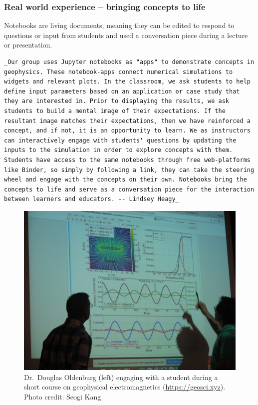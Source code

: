 \documentclass[]{book}
\begin{document}
\subsubsection{Real world experience -- bringing concepts to
life}\label{real-world-experience-bringing-concepts-to-life}

Notebooks are living documents, meaning they can be edited to respond to
questions or input from students and used a conversation piece during a
lecture or presentation.

\begin{verbatim}
_Our group uses Jupyter notebooks as "apps" to demonstrate concepts in geophysics. These notebook-apps connect numerical simulations to widgets and relevant plots. In the classroom, we ask students to help define input parameters based on an application or case study that they are interested in. Prior to displaying the results, we ask students to build a mental image of their expectations. If the resultant image matches their expectations, then we have reinforced a concept, and if not, it is an opportunity to learn. We as instructors can interactively engage with students' questions by updating the inputs to the simulation in order to explore concepts with them. Students have access to the same notebooks through free web-platforms like Binder, so simply by following a link, they can take the steering wheel and engage with the concepts on their own. Notebooks bring the concepts to life and serve as a conversation piece for the interaction between learners and educators. -- Lindsey Heagy_
\end{verbatim}

\begin{figure}
\centering
\includegraphics{images/oldenburg-geosci.jpg}
\caption{Dr.~Douglas Oldenburg (left) engaging with a student during a
short course on geophysical electromagnetics (\url{https://geosci.xyz}).
Photo credit: Seogi Kang}
\end{figure}
\end{document}
